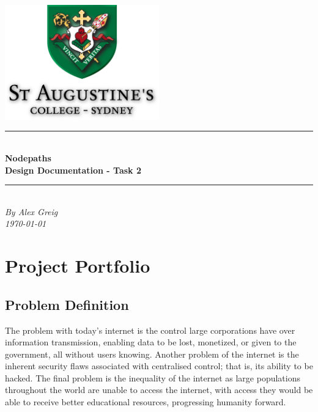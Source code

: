 \documentclass[a4paper, titlepage]{article}
\begin{document}
\title{}
\author{Alex Greig}
\begin{titlepage}
	\centering
	\includegraphics[width=0.5\textwidth]{sta-logo.png}\par
	\vspace{1.5cm}
	\noindent\rule{12cm}{0.07cm} \\
	\vspace{0.2cm}
	{\huge{\textbf{Nodepaths\\Design Documentation - Task 2}}\\}
	\vspace{0.2cm}
	\noindent\rule{12cm}{0.07cm} \\
	\vspace{1.5cm}
	{\LARGE{\emph{By Alex Greig}}} \\
	\vspace{1.5cm}
	{\large{\emph{ \today}}}
	\vfill
\end{titlepage}

\tableofcontents
\vfill
\section{Project Portfolio}

\subsection{Problem Definition}
The problem with today's internet is the control large corporations have over information transmission, enabling data to be lost, monetized, or given to the government, all without users knowing. Another problem of the internet is the inherent security flaws associated with centralised control; that is, its ability to be hacked. The final problem is the inequality of the internet as large populations throughout the world are unable to access the internet, with access they would be able to receive better educational resources, progressing humanity forward. \\
\end{document}
